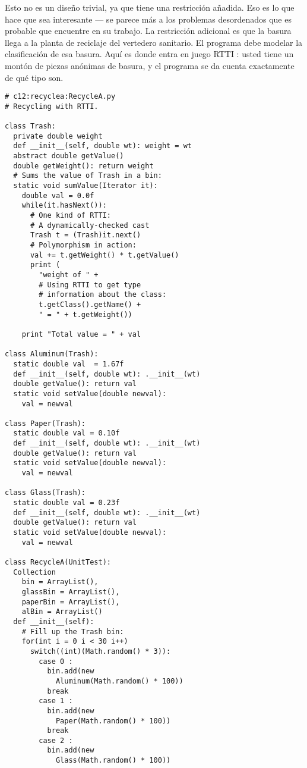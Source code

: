 Esto no es un diseño trivial, ya que tiene una restricción añadida. Eso es lo que hace que sea interesante — se parece más a los problemas desordenados que es probable que encuentre en su trabajo. La restricción adicional es que la basura llega a la planta de reciclaje del vertedero sanitario. El programa debe modelar la clasificación de esa basura. Aquí es donde entra en juego RTTI : usted tiene un montón de piezas anónimas de basura, y el programa se da cuenta exactamente de qué tipo son.  \newline

\begin{lstlisting} 
# c12:recyclea:RecycleA.py  
# Recycling with RTTI. 

class Trash: 
  private double weight 
  def __init__(self, double wt): weight = wt  
  abstract double getValue() 
  double getWeight(): return weight  
  # Sums the value of Trash in a bin: 
  static void sumValue(Iterator it): 
    double val = 0.0f 
    while(it.hasNext()): 
      # One kind of RTTI: 
      # A dynamically-checked cast 
      Trash t = (Trash)it.next() 
      # Polymorphism in action: 
      val += t.getWeight() * t.getValue() 
      print ( 
        "weight of " + 
        # Using RTTI to get type 
        # information about the class: 
        t.getClass().getName() + 
        " = " + t.getWeight()) 
        
    print "Total value = " + val 
    
class Aluminum(Trash): 
  static double val  = 1.67f 
  def __init__(self, double wt): .__init__(wt)  
  double getValue(): return val  
  static void setValue(double newval): 
    val = newval 
    
class Paper(Trash): 
  static double val = 0.10f 
  def __init__(self, double wt): .__init__(wt)  
  double getValue(): return val  
  static void setValue(double newval): 
    val = newval 
    
class Glass(Trash): 
  static double val = 0.23f 
  def __init__(self, double wt): .__init__(wt)  
  double getValue(): return val  
  static void setValue(double newval): 
    val = newval 
    
class RecycleA(UnitTest): 
  Collection  
    bin = ArrayList(), 
    glassBin = ArrayList(), 
    paperBin = ArrayList(), 
    alBin = ArrayList() 
  def __init__(self): 
    # Fill up the Trash bin: 
    for(int i = 0 i < 30 i++) 
      switch((int)(Math.random() * 3)): 
        case 0 : 
          bin.add(new 
            Aluminum(Math.random() * 100)) 
          break 
        case 1 : 
          bin.add(new 
            Paper(Math.random() * 100)) 
          break 
        case 2 : 
          bin.add(new 
            Glass(Math.random() * 100)) 
            

\end{lstlisting}
